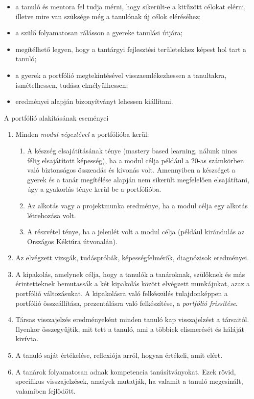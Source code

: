 \begin{itemize}
\item a tanuló és mentora fel tudja mérni, hogy sikerült-e a kitűzött célokat elérni, illetve mire van szüksége még a tanulónak új célok eléréséhez;

\item a szülő folyamatosan rálásson a gyereke tanulási útjára;

\item megítélhető legyen, hogy a tantárgyi fejlesztési területekhez képest hol tart a tanuló;

\item a gyerek a portfólió megtekintésével visszaemlékezhessen a tanultakra, ismételhessen, tudása elmélyülhessen;

\item eredményei alapján bizonyítványt lehessen kiállítani.

\end{itemize}
A portfólió alakításának eseményei
\begin{enumerate}
\item Minden \emph{modul végeztével} a portfólióba kerül:

\begin{enumerate}

\item  A készség elsajátításának ténye (mastery based learning, nálunk nincs félig elsajátított képesség), ha a modul célja például a 20-as számkörben való biztonságos összeadás és kivonás volt. Amennyiben a készséget a gyerek és a tanár megítélése alapján nem sikerült megfelelően elsajátítani, úgy a gyakorlás ténye kerül be a portfólióba.
\item Az alkotás vagy a projektmunka eredménye, ha a modul célja egy alkotás létrehozása volt.
\item A részvétel ténye, ha a jelenlét volt a modul célja (például kirándulás az Országos Kéktúra útvonalán).


\end{enumerate}
\item Az elvégzett vizsgák, tudáspróbák, képességfelmérők, diagnózisok eredményei.

\item A kipakolás, amelynek célja, hogy a tanulók a tanároknak, szülőknek és más érintetteknek bemutassák a két kipakolás között elvégzett munkájukat, azaz a portfólió változásukat. A kipakolásra való felkészülés tulajdonképpen a portfólió összeállítása, prezentálásra való felkészítése, a \emph{portfólió frissítése}.

\item Társas visszajelzés eredményeként minden tanuló kap visszajelzést a társaitól. Ilyenkor összegyűjtik, mit tett a tanuló, ami a többiek elismerését és háláját kivívta.

\item A tanuló saját értékelése, reflexiója arról, hogyan értékeli, amit elért.

\item A tanárok folyamatosan adnak kompetencia tanúsítványokat. Ezek rövid, specifikus visszajelzések, amelyek mutatják, ha valamit a tanuló megcsinált, valamiben fejlődött.
\end{enumerate}

